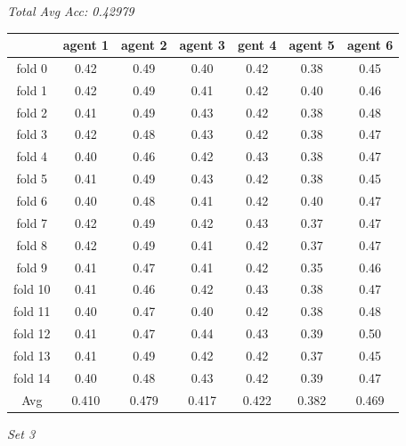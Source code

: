 \documentclass[10pt]{article}
\newcommand{\skipline}{\vspace{\baselineskip}}
\begin{document}
\begin{center}
    \textit{Total Avg Acc: 0.42979}
    \footnotesize
    \begin{tabular}{| c | c | c | c | c | c | c |}
      \hline
       & agent 1 & agent 2 & agent 3 & gent 4 & agent 5 & agent 6 \\
      \hline
      fold 0 & 0.42 & 0.49 & 0.40 & 0.42 & 0.38 & 0.45 \\
      fold 1 & 0.42 & 0.49 & 0.41 & 0.42 & 0.40 & 0.46 \\
      fold 2 & 0.41 & 0.49 & 0.43 & 0.42 & 0.38 & 0.48 \\
      fold 3 & 0.42 & 0.48 & 0.43 & 0.42 & 0.38 & 0.47 \\
      fold 4 & 0.40 & 0.46 & 0.42 & 0.43 & 0.38 & 0.47 \\
      fold 5 & 0.41 & 0.49 & 0.43 & 0.42 & 0.38 & 0.45 \\
      fold 6 & 0.40 & 0.48 & 0.41 & 0.42 & 0.40 & 0.47 \\
      fold 7 & 0.42 & 0.49 & 0.42 & 0.43 & 0.37 & 0.47 \\
      fold 8 & 0.42 & 0.49 & 0.41 & 0.42 & 0.37 & 0.47 \\
      fold 9 & 0.41 & 0.47 & 0.41 & 0.42 & 0.35 & 0.46 \\
      fold 10 & 0.41 & 0.46 & 0.42 & 0.43 & 0.38 & 0.47 \\
      fold 11 & 0.40 & 0.47 & 0.40 & 0.42 & 0.38 & 0.48 \\
      fold 12 & 0.41 & 0.47 & 0.44 & 0.43 & 0.39 & 0.50 \\
      fold 13 & 0.41 & 0.49 & 0.42 & 0.42 & 0.37 & 0.45 \\
      fold 14 & 0.40 & 0.48 & 0.43 & 0.42 & 0.39 & 0.47 \\
      Avg & 0.410 & 0.479 & 0.417 & 0.422 & 0.382 & 0.469 \\
      \hline
    \end{tabular}
    \normalsize

    \skipline

    \textit{Set 3}


\end{center}
\end{document}
